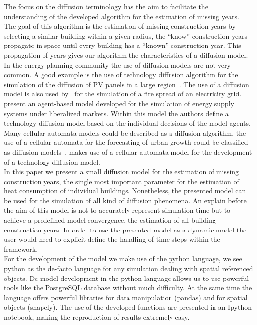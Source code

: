 The focus on the diffusion terminology has the aim to facilitate the
understanding of the developed algorithm for the estimation of missing years.
The goal of this algorithm is the estimation of missing construction years by
selecting a similar building within a given radius, the ``know'' construction
years propagate in space until every building has a ``known'' construction
year. This propagation of years gives our algorithm the characteristics of a
diffusion model.\\

In the energy planning community the use of diffusion models are not very
common. A good example is the use of technology diffusion algorithm for the
simulation of the diffusion of PV panels in a large region~.
The use of a diffusion model is also used by~ for the
simulation of a fire spread of an electricity grid. 
 present an agent-based model developed for the simulation
of energy supply systems under liberalized markets. Within this model the
authors define a technology diffusion model based on the individual decisions
of the model agents.
%
Many cellular automata models could be described as a diffusion algorithm, the
use of a cellular automata for the forecasting of urban growth could be
classified as diffusion models~\cite{Han.2009,Batty.1999}. 
makes use of a cellular automata model for the development of a technology
diffusion model.\\

In this paper we present a small diffusion model for the estimation of missing
construction years, the single most important parameter for the estimation of
heat consumption of individual buildings. Nonetheless, the presented model can
be used for the simulation of all kind of diffusion phenomena. An explain
before the aim of this model is not to accurately represent simulation time but
to achieve a predefined model convergence, the estimation of all building
construction years. In order to use the presented model as a dynamic model the
user would need to explicit define the handling of time steps within the
framework.\\

For the development of the model we make use of the python language, we see
python as the de-facto language for any simulation dealing with spatial
referenced objects. De model development in the python language allows us to
use powerful tools like the PostgreSQL database without much difficulty. At the
same time the language offers powerful libraries for data manipulation
(pandas) and for spatial objects (shapely). The use of the developed functions
are presented in an Ipython notebook, making the reproduction of results
extremely easy.\\

